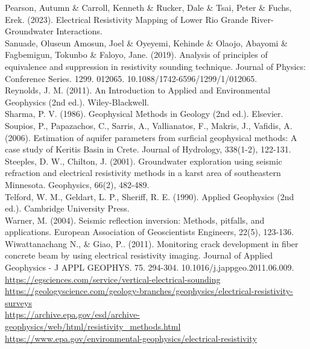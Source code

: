 \documentclass[12pt,a4paper]{report}
\begin{document}
\begin{justify}
    Pearson, Autumn \& Carroll, Kenneth \& Rucker, Dale \& Tsai, Peter \& Fuchs, Erek. (2023). Electrical Resistivity Mapping of Lower Rio Grande River-Groundwater Interactions. \\

    Sanuade, Oluseun Amosun, Joel \& Oyeyemi, Kehinde \& Olaojo, Abayomi \& Fagbemigun, Tokunbo \& Faloyo, Jane. (2019). Analysis of principles of equivalence and suppression in resistivity sounding technique. Journal of Physics: Conference Series. 1299. 012065. 10.1088/1742-6596/1299/1/012065. \\

    Reynolds, J. M. (2011). An Introduction to Applied and Environmental Geophysics (2nd ed.). Wiley-Blackwell. \\
    
    Sharma, P. V. (1986). Geophysical Methods in Geology (2nd ed.). Elsevier. \\
    
    Soupios, P., Papazachos, C., Sarris, A., Vallianatos, F., Makris, J., Vafidis, A. (2006). Estimation of aquifer parameters from surficial geophysical methods: A case study of Keritis Basin in Crete. Journal of Hydrology, 338(1-2), 122-131. \\
    
    Steeples, D. W., Chilton, J. (2001). Groundwater exploration using seismic refraction and electrical resistivity methods in a karst area of southeastern Minnesota. Geophysics, 66(2), 482-489. \\
    
    Telford, W. M., Geldart, L. P., Sheriff, R. E. (1990). Applied Geophysics (2nd ed.). Cambridge University Press. \\
    
    Warner, M. (2004). Seismic reflection inversion: Methods, pitfalls, and applications. European Association of Geoscientists Engineers, 22(5), 123-136. \\

    Wiwattanachang N., \& Giao, P.. (2011). Monitoring crack development in fiber concrete beam by using electrical resistivity imaging. Journal of Applied Geophysics - J APPL GEOPHYS. 75. 294-304. 10.1016/j.jappgeo.2011.06.009. \\

    \noindent
    \url{https://egsciences.com/service/vertical-electrical-sounding} \\

    \url{https://geologyscience.com/geology-branches/geophysics/electrical-resistivity-surveys} \\

    \url{https://archive.epa.gov/esd/archive-geophysics/web/html/resistivity_methods.html} \\

    \url{https://www.epa.gov/environmental-geophysics/electrical-resistivity}

\end{justify}
\end{document}

